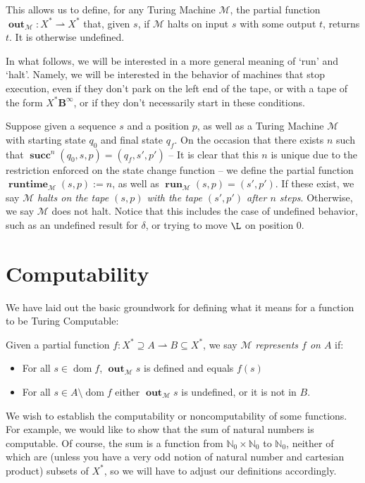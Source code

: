 \documentclass{article}
\newcommand{\B}{\mathbf{B}}
\newcommand{\N}{\mathbb{N}}
\newcommand{\M}{\mathcal{M}}
\DeclareMathOperator{\suc}{\mathbf{succ}}
\DeclareMathOperator{\run}{\mathbf{run}}
\DeclareMathOperator{\dom}{\mathrm{dom}}
\DeclareMathOperator{\runtime}{\mathbf{runtime}}
\DeclareMathOperator{\out}{\mathbf{out}}
\begin{document}
	This allows us to define, for any Turing Machine $\M$, the partial function $\out_\M : X^* \rightharpoonup X^*$ that, given $s$, if $\M$ halts on input $s$ with some output $t$, returns $t$. It is otherwise undefined.
	
	In what follows, we will be interested in a more general meaning of `run' and `halt'. Namely, we will be interested in the behavior of machines that stop execution, even if they don't park on the left end of the tape, or with a tape of the form $X^* \B^\infty$, or if they don't necessarily start in these conditions.
	
	Suppose given a sequence $s$ and a position $p$, as well as a Turing Machine $\M$ with starting state $q_0$ and final state $q_f$. On the occasion that there exists $n$ such that $\suc^n (q_0, s, p) = (q_f, s', p')$ -- It is clear that this $n$ is unique due to the restriction enforced on the state change function -- we define the partial function $\runtime_\M (s,p) := n$, as well as $\run_\M (s, p) = (s', p')$. If these exist, we say $\M$ \emph{halts on the tape $(s,p)$ with the tape $(s', p')$ after $n$ steps}. Otherwise, we say $\M$ does not halt. Notice that this includes the case of undefined behavior, such as an undefined result for $\delta$, or trying to move $\L$ on position 0.
	
	\section{Computability}
	
	We have laid out the basic groundwork for defining what it means for a function to be Turing Computable:
	
	Given a partial function $f : X^* \supseteq A \rightharpoonup B \subseteq X^*$, we say $\M$ \emph{represents $f$ on $A$} if:
	
	\begin{itemize}
	
	\item For all $s \in \dom f$, $\out_\M s$ is defined and equals $f(s)$
	
	\item For all $s \in A \setminus \dom f$ either $\out_\M s$ is undefined, or it is not in $B$.
	
	\end{itemize}
	
	We wish to establish the computability or noncomputability of some functions. For example, we would like to show that the sum of natural numbers is computable. Of course, the sum is a function from $\N_0 \times \N_0$ to $\N_0$, neither of which are (unless you have a very odd notion of natural number and cartesian product) subsets of $X^*$, so we will have to adjust our definitions accordingly.
	
\end{document}
